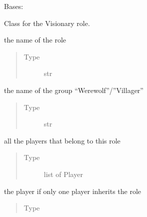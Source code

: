 \documentclass[letterpaper,10pt,english]{sphinxmanual}
\begin{document}
\begin{fulllineitems}
Bases: 

Class for the Visionary role.


\begin{fulllineitems}
the name of the role
\begin{quote}\begin{description}
\item[{Type}] \leavevmode
str

\end{description}\end{quote}

\end{fulllineitems}



\begin{fulllineitems}
the name of the group “Werewolf”/”Villager”
\begin{quote}\begin{description}
\item[{Type}] \leavevmode
str

\end{description}\end{quote}

\end{fulllineitems}



\begin{fulllineitems}
all the players that belong to this role
\begin{quote}\begin{description}
\item[{Type}] \leavevmode
list of Player

\end{description}\end{quote}

\end{fulllineitems}



\begin{fulllineitems}
the player if only one player inherits the role
\begin{quote}\begin{description}
\item[{Type}] \leavevmode
{\hyperref[\detokenize{chatwolf:chatwolf.player.Player}]{}}


\end{description}
\end{quote}
\end{fulllineitems}
\end{fulllineitems}
\end{document}
